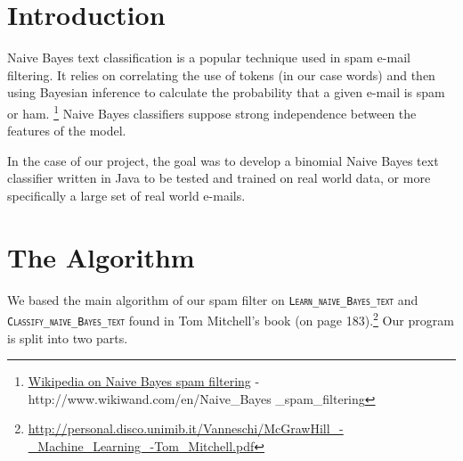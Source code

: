 \documentclass[12pt,a4paper]{report}
\begin{document}
\tableofcontents \pagebreak

\section{Introduction}
Naive Bayes text classification is a popular technique used in spam e-mail filtering. It relies on correlating the use of tokens (in our case words) and then using Bayesian inference to calculate the probability that a given e-mail is spam or ham. \footnote{\href{http://www.wikiwand.com/en/Naive\_Bayes\_spam\_filtering}{Wikipedia on Naive Bayes spam filtering} -  http://www.wikiwand.com/en/Naive\_Bayes \_spam\_filtering}
Naive Bayes classifiers suppose strong independence between the features of the model.

In the case of our project, the goal was to develop a binomial Naive Bayes text classifier written in Java to be tested and trained on real world data, or more specifically a large set of real world e-mails.

\section{The Algorithm}
We based the main algorithm of our spam filter on  \texttt{\textsc{Learn\_naive\_Bayes\_text}} and \texttt{\textsc{Classify\_naive\_Bayes\_text}} found in Tom Mitchell's book (on page 183).\footnote{\href{http://personal.disco.unimib.it/Vanneschi/McGrawHill\_-\_Machine\_Learning\_-Tom\_Mitchell.pdf}{http://personal.disco.unimib.it/Vanneschi/McGrawHill\_-\_Machine\_Learning\_-Tom\_Mitchell.pdf}} 
Our program is split into two parts.
\end{document}
